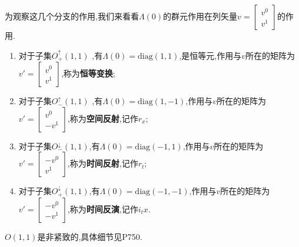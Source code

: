 \documentclass[../main.tex]{subfiles}
\begin{document}
 为观察这几个分支的作用,我们来看看$\Lambda(0)$的群元作用在列矢量$v = \begin{bmatrix}v^0\\v^1\end{bmatrix}$的作用.
 \begin{enumerate}
     \item 对于子集$O^\uparrow_+(1,1)$  ,有$\Lambda(0) =\text{diag}(1,1)$,是恒等元,作用与$v$所在的矩阵为$v'=\begin{bmatrix}v^0\\v^1 \end{bmatrix}$,称为\textbf{恒等变换};
     \item 对于子集$O^\uparrow_-(1,1)$  ,有$\Lambda(0) =\text{diag}(1,-1) $,作用与$v$所在的矩阵为$v'=\begin{bmatrix}v^0\\-v^1\end{bmatrix}$,称为\textbf{空间反射},记作$r_x$;
     \item 对于子集$O^\downarrow_-(1,1)$,有$\Lambda(0) =\text{diag}(-1,1) $,作用与$v$所在的矩阵为$v'=\begin{bmatrix}-v^0\\v^1\end{bmatrix}$,称为\textbf{时间反射},记作$r_t$;
     \item 对于子集$O^\downarrow_+(1,1)$,有$\Lambda(0) =\text{diag}(-1,-1) $,作用与$v$所在的矩阵为$v'=\begin{bmatrix}-v^0\\-v^1\end{bmatrix}$,称为\textbf{时间反演},记作$i_tx$.
 \end{enumerate}
 $O(1,1)$是非紧致的,具体细节见P750.
\end{document}
